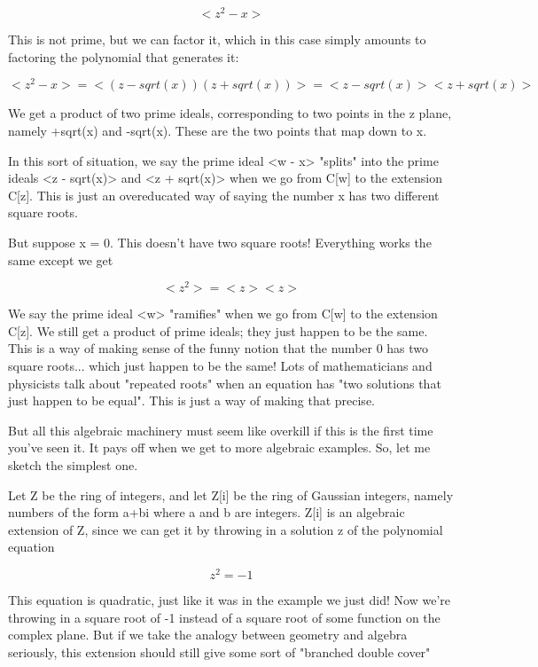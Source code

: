 $$

<z^{2} - x>
$$
    
This is not prime, but we can factor it, which in this case simply 
amounts to factoring the polynomial that generates it:


$$

<z^{2} - x> = <(z - sqrt(x)) (z + sqrt(x))> 

         =  <z - sqrt(x)> <z + sqrt(x)>
$$
    
We get a product of two prime ideals, corresponding to two points in 
the z plane, namely +sqrt(x) and -sqrt(x).  These are the two points
that map down to x.

In this sort of situation, we say the prime ideal <w - x> 
"splits"
into the prime ideals <z - sqrt(x)> and <z + sqrt(x)> when 
we go from
C[w] to the extension C[z].  This is just an overeducated way of saying
the number x has two different square roots.

But suppose x = 0.  This doesn't have two square roots!  Everything
works the same except we get


$$

<z^{2}> = <z> <z>
$$
    
We say the prime ideal <w> "ramifies" when we go 
from C[w] to the 
extension C[z].  We still get a product of prime ideals; they just happen 
to be the same.  This is a way of making sense of the funny notion that 
the number 0 has two square roots... which just happen to be the same!  
Lots of mathematicians and physicists talk about "repeated roots"
when 
an equation has "two solutions that just happen to be equal".  
This is just a way of making that precise.

But all this algebraic machinery must seem like overkill if this is the 
first time you've seen it.  It pays off when we get to more algebraic 
examples.  So, let me sketch the simplest one.

Let Z be the ring of integers, and let Z[i] be the ring of Gaussian 
integers, namely numbers of the form a+bi where a and b are integers.  
Z[i] is an algebraic extension of Z, since we can get it by throwing in 
a solution z of the polynomial equation


$$

z^{2} = -1
$$
    

This equation is quadratic, just like it was in the example we just
did!  Now we're throwing in a square root of -1 instead of a square 
root of some function on the complex plane.  But if we take the analogy 
between geometry and algebra seriously, this extension should still give
some sort of "branched double cover"


